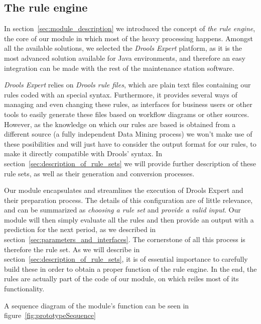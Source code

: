 \subsection{The rule engine}
In section~\ref{sec:module_description} we introduced the concept of \emph{the rule engine}, the core of our module in which most of the heavy processing happens. Amongst all the available solutions, we selected the \emph{Drools Expert}\cite{browne2009jboss} platform, as it is the most advanced solution available for Java environments, and therefore an easy integration can be made with the rest of the maintenance station software.

\emph{Drools Expert} relies on \emph{Drools rule files}, which are plain text files containing our rules coded with an special syntax. Furthermore, it provides several ways of managing and even changing these rules, as interfaces for business users or other tools to easily generate these files based on workflow diagrams or other sources. However, as the knowledge on which our rules are based is obtained from a different source (a fully independent Data Mining process) we won't make use of these posibilities and will just have to consider the output format for our rules, to make it directly compatible with Drools' syntax. In section~\ref{sec:description_of_rule_sets} we will provide further description of these rule sets, as well as their generation and conversion processes.

Our module encapsulates and streamlines the execution of Drools Expert and their preparation process. The details of this configuration are of little relevance, and can be summarized as \emph{choosing a rule set} and \emph{provide a valid input}. Our module will then simply evaluate all the rules and then provide an output with a prediction for the next period, as we described in section~\ref{sec:parameters_and_interfaces}. The cornerstone of all this process is therefore the rule set. As we will describe in section~\ref{sec:description_of_rule_sets}, it is of essential importance to carefully build these in order to obtain a proper function of the rule engine. In the end, the rules are actually part of the code of our module, on which reiles most of its functionality.

A sequence diagram of the module's function can be seen in figure~\ref{fig:prototypeSequence}

